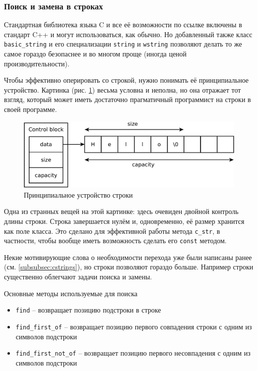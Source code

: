 \documentclass[a4paper,12pt,oneside]{article}
\begin{document}
\subsubsection{Поиск и замена в строках}\label{CStringToStdString}

Стандартная библиотека языка C и все её возможности по ссылке включены в стандарт C++ и могут использоваться, как обычно. Но добавленный также класс \lstinline!basic_string! и его специализации \lstinline!string! и \lstinline!wstring! позволяют делать то же самое гораздо безопаснее и во многом проще (иногда ценой производительности).

Чтобы эффективно оперировать со строкой, нужно понимать её принципиальное устройство. Картинка (рис. \ref{fig:string-principal}) весьма условна и неполна, но она отражает тот взгляд, который может иметь достаточно прагматичный программист на строки в своей программе.

\begin{figure}[ht]
\centering
\includegraphics[width=1.0\textwidth]{illustrations/string-principal-crop.pdf}
\caption{Принципиальное устройство строки}
\label{fig:string-principal}
\end{figure}

Одна из странных вещей на этой картинке: здесь очевиден двойной контроль длины строки. Строка завершается нулём и, одновременно, её размер хранится как поле класса. Это сделано для эффективной работы метода \lstinline!c_str!, в частности, чтобы вообще иметь возможность сделать его \lstinline!const! методом.

Некие мотивирующие слова о необходимости перехода уже были написаны ранее (см. \ref{subsubsec:cstrings}), но строки позволяют гораздо больше. Например строки существенно облегчают задачи поиска и замены.

Основные методы используемые для поиска

\begin{itemize}
\item \lstinline!find! -- возвращает позицию подстроки в строке
\item \lstinline!find_first_of! -- возвращает позицию первого совпадения строки с одним из символов подстроки
\item \lstinline!find_first_not_of! -- возвращает позицию первого несовпадения с одним из символов подстроки
\end{itemize}
\end{document}
